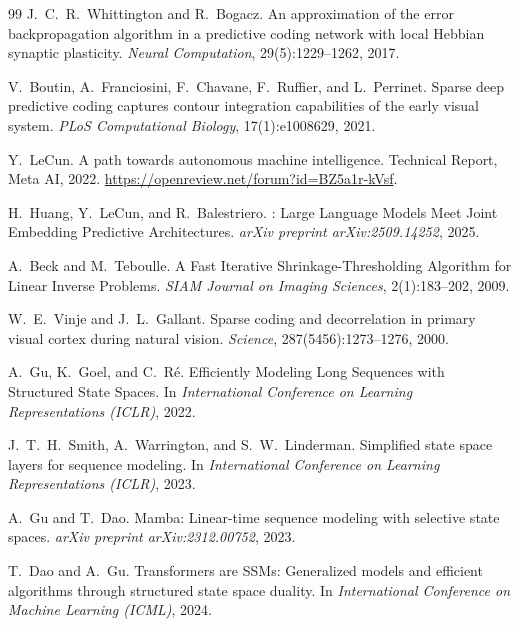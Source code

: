 \documentclass{article}
\begin{document}
\begin{thebibliography}{99}
J.\ C.\ R.\ Whittington and R.\ Bogacz.
\newblock An approximation of the error backpropagation algorithm in a
predictive coding network with local Hebbian synaptic plasticity.
\newblock \emph{Neural Computation}, 29(5):1229--1262, 2017.

V.\ Boutin, A.\ Franciosini, F.\ Chavane, F.\ Ruffier, and L.\ Perrinet.
\newblock Sparse deep predictive coding captures contour integration
capabilities of the early visual system.
\newblock \emph{PLoS Computational Biology}, 17(1):e1008629, 2021.

Y.\ LeCun.
\newblock A path towards autonomous machine intelligence.
\newblock Technical Report, Meta AI, 2022.
\newblock \url{https://openreview.net/forum?id=BZ5a1r-kVsf}.

H.\ Huang, Y.\ LeCun, and R.\ Balestriero.
: Large Language Models Meet Joint Embedding Predictive Architectures.
\newblock \emph{arXiv preprint arXiv:2509.14252}, 2025.

A.\ Beck and M.\ Teboulle.
\newblock A Fast Iterative Shrinkage-Thresholding Algorithm for Linear Inverse Problems.
\newblock \emph{SIAM Journal on Imaging Sciences}, 2(1):183--202, 2009.

W.\ E.\ Vinje and J.\ L.\ Gallant.
\newblock Sparse coding and decorrelation in primary visual cortex during
natural vision.
\newblock \emph{Science}, 287(5456):1273--1276, 2000.

A.\ Gu, K.\ Goel, and C.\ R\'e.
\newblock Efficiently Modeling Long Sequences with Structured State Spaces.
\newblock In \emph{International Conference on Learning Representations (ICLR)},
2022.

J.\ T.\ H.\ Smith, A.\ Warrington, and S.\ W.\ Linderman.
\newblock Simplified state space layers for sequence modeling.
\newblock In \emph{International Conference on Learning Representations (ICLR)},
2023.

A.\ Gu and T.\ Dao.
\newblock Mamba: Linear-time sequence modeling with selective state spaces.
\newblock \emph{arXiv preprint arXiv:2312.00752}, 2023.

T.\ Dao and A.\ Gu.
\newblock Transformers are {SSMs}: Generalized models and efficient algorithms
through structured state space duality.
\newblock In \emph{International Conference on Machine Learning (ICML)}, 2024.


\end{thebibliography}
\end{document}
